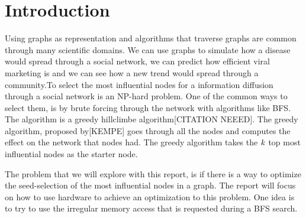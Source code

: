 \chapter{Introduction} 

Using graphs as representation and algorithms that traverse graphs are common through many scientific domains\cite{HybridBFS2015}. We can use graphs to simulate how a disease would spread through a social network, we can predict how efficient viral marketing is and we can see how a new trend would spread through a community\cite{MaximizeSpread2003}.To select the most influential nodes for a information diffusion through a social network is an NP-hard problem\cite{MaximizeSpread2003}. One of the common ways to select them, is by brute forcing through the network with algorithms like BFS. The algorithm is a greedy hillclimbe algorithm[CITATION NEEED]. The greedy algorithm, proposed by[KEMPE] goes through all the nodes and computes the effect on the network that nodes had. The greedy algorithm takes the $\it{k}$ top most influential nodes as the starter node. 

The problem that we will explore with this report, is if there is a way to optimize the seed-selection of the most influential nodes in a graph. The report will focus on how to use hardware to achieve an optimization to this problem. One idea is to try to use the irregular memory access that is requested during a BFS search. 

